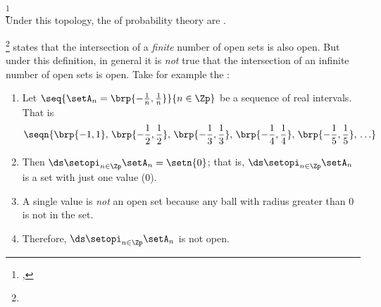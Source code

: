 \begin{example}
\label{ex:top_sorgengrey}
\footnote{
  ,
  }
\\
Under this topology, the  of probability theory are .
\end{example}


\begin{counterex}
\footnote{
  }
 states that the intersection of a \emph{finite} number of 
open sets is also open.
But under this definition, in general it is \emph{not} true that the intersection of an infinite number of open sets is open.
Take for example the  :
\begin{enumerate}
  \item Let  $\seq{\setA_n=\brp{-\frac{1}{n},\frac{1}{n}}}{n\in\Zp}$ be a sequence
        of real intervals. That is
        \[\seqn{
          \brp{-1,1},\, \brp{-\frac{1}{2},\frac{1}{2}},\,
                        \brp{-\frac{1}{3},\frac{1}{3}},\,
                        \brp{-\frac{1}{4},\frac{1}{4}},\,
                        \brp{-\frac{1}{5},\frac{1}{5}},\,\ldots
        }\]

  \item Then $\ds\setopi_{n\in\Zp} \setA_n = \setn{0}$; 
        that is, $\ds\setopi_{n\in\Zp} \setA_n$ is a set with just one value ($0$).

  \item A single value is \emph{not} an open set because any ball with radius greater than $0$
        is not in the set. 

  \item Therefore, $\ds\setopi_{n\in\Zp} \setA_n$ is not open.
\end{enumerate}
\end{counterex}



